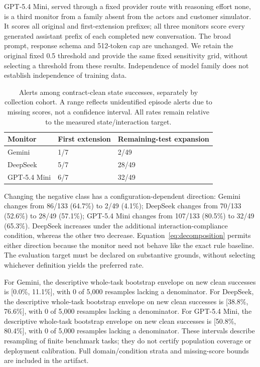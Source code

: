GPT-5.4 Mini, served through a fixed provider route with reasoning effort none, is a third monitor from a family absent from the actors and customer simulator. It scores all original and first-extension prefixes; all three monitors score every generated assistant prefix of each completed new conversation. The broad prompt, response schema and 512-token cap are unchanged. We retain the original fixed 0.5 threshold and provide the same fixed sensitivity grid, without selecting a threshold from these results. Independence of model family does not establish independence of training data.

\begin{table}[t]\centering\small
\caption{Alerts among contract-clean state successes, separately by collection cohort. A range reflects unidentified episode alerts due to missing scores, not a confidence interval. All rates remain relative to the measured state/interaction target.}\label{tab:expanded-monitors}
\begin{tabular}{lll}
\toprule
Monitor & First extension & Remaining-test expansion\\
\midrule
Gemini & 1/7 & 2/49\\
DeepSeek & 5/7 & 28/49\\
GPT-5.4 Mini & 6/7 & 32/49\\
\bottomrule
\end{tabular}
\end{table}
Changing the negative class has a configuration-dependent direction: Gemini changes from 86/133 (64.7\%) to 2/49 (4.1\%); DeepSeek changes from 70/133 (52.6\%) to 28/49 (57.1\%); GPT-5.4 Mini changes from 107/133 (80.5\%) to 32/49 (65.3\%). DeepSeek increases under the additional interaction-compliance condition, whereas the other two decrease. Equation~\ref{eq:decomposition} permits either direction because the monitor need not behave like the exact rule baseline. The evaluation target must be declared on substantive grounds, without selecting whichever definition yields the preferred rate.

For Gemini, the descriptive whole-task bootstrap envelope on new clean successes is [0.0\%, 11.1\%], with 0 of 5,000 resamples lacking a denominator. For DeepSeek, the descriptive whole-task bootstrap envelope on new clean successes is [38.8\%, 76.6\%], with 0 of 5,000 resamples lacking a denominator. For GPT-5.4 Mini, the descriptive whole-task bootstrap envelope on new clean successes is [50.8\%, 80.4\%], with 0 of 5,000 resamples lacking a denominator. These intervals describe resampling of finite benchmark tasks; they do not certify population coverage or deployment calibration. Full domain/condition strata and missing-score bounds are included in the artifact.

